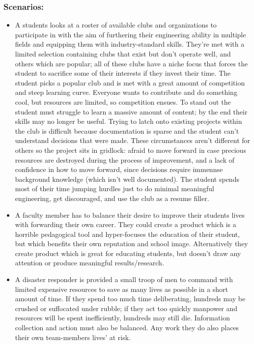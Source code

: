 \documentclass[a4paper, 10pt]{article}
\begin{document}
		\subsubsection*{Scenarios:}
		\begin{itemize}
			\item
			A students looks at a roster of available clubs and organizations to participate in with the aim of furthering their engineering ability in multiple fields and equipping them with industry-standard skills. They're met with a limited selection containing clubs that exist but don't operate well, and others which are popular; all of these clubs have a niche focus that forces the student to sacrifice some of their interests if they invest their time. The student picks a popular club and is met with a great amount of competition and steep learning curve. Everyone wants to contribute and do something cool, but resources are limited, so competition ensues. To stand out the student  must struggle to learn a massive amount of content; by the end their skills may no longer  be useful. Trying to latch onto existing projects within the club is difficult because documentation is sparse and the student can't understand decisions that were made. These circumstances aren't different for others so the project sits in gridlock: afraid to move forward in case precious resources are destroyed during the process of improvement, and a lack of confidence in how to move forward, since decisions require immennse background knowledge (which isn't well documented). The student spends most of their time jumping hurdles just to do minimal meaningful engineering, get discouraged, and use the club as a resume filler.

			\item
			A faculty member has to balance their desire to improve their students lives with forwarding their own career. They could create a product which is a horrible pedagogical tool and hyper-focuses the education of their student, but which benefits their own reputation and school image. Alternatively they create product which is great for educating students, but doesn't draw any attention or produce meaningful results/research. 
			
			\item
			A disaster responder is provided a small troop of men to command with limited expensive resources to save as many lives as possible in a short amount of time. If they spend too much time deliberating, hundreds may be crushed or suffocated under rubble; if they act too quickly manpower and resources will be spent inefficiently, hundreds may still die. Information collection and action must also be balanced. Any work they do also places their own team-members lives' at risk.
		\end{itemize}
		
\end{document}
